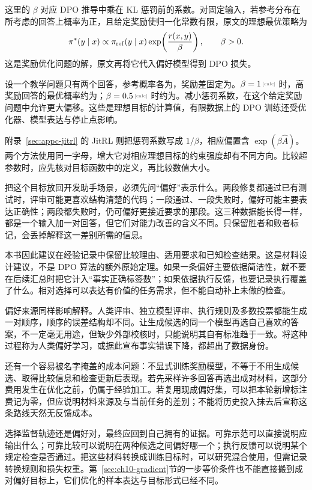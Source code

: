 这里的 $\beta$ 对应 DPO 推导中乘在 KL 惩罚前的系数。对固定输入，若参考分布在所考虑的回答上概率为正，且给定奖励使归一化常数有限，原文的理想最优策略为
\begin{equation}
 \pi^*(y\mid x)\propto\pi_{\rm ref}(y\mid x)
 \exp\!\left(\frac{r(x,y)}{\beta}\right),\qquad\beta>0.
 \label{eq:ch10-kl-scale}
\end{equation}
这是奖励优化问题的解，原文再将它代入偏好模型得到 DPO 损失\cite{dpo-2305}。

设一个教学问题只有两个回答，参考概率各为，奖励差固定为。$\beta=\calcnum{1}$ 时，高奖励回答的最优概率约为；$\beta=\calcnum{0.5}$ 时约为。减小惩罚系数，在这个给定奖励问题中允许更大偏移。这些是理想目标的计算值，有限数据上的 DPO 训练还受优化器、模型表达与停止点影响。

附录~\ref{sec:appc-jitrl} 的 JitRL 则把惩罚系数写成 $1/\beta$，相应偏置含 $\exp(\beta\widehat A)$\cite{jitrl-2601}。两个方法使用同一字母，增大它对相应理想目标的约束强度却有不同方向。比较超参数时，应先核对目标函数中的定义，再比较数值大小。

把这个目标放回开发助手场景，必须先问“偏好”表示什么。两段修复都通过已有测试时，评审可能更喜欢结构清楚的代码；一段通过、一段失败时，偏好可能主要表达正确性；两段都失败时，仍可偏好更接近要求的那段。这三种数据能长得一样，都是一个输入加一对回答，但它们对能力改善的含义不同。只保留胜者和败者标记，会丢掉解释这一差别所需的信息。

本书因此建议在经验记录中保留比较理由、适用要求和已知检查结果。这是材料设计建议，不是 DPO 算法的额外原始定理。如果一条偏好主要依据简洁性，就不要在后续汇总时把它计入“事实正确标签数”；如果依据执行反馈，也要记录执行覆盖了什么。相对选择可以表达有价值的任务需求，但不能自动补上未做的检查。

偏好来源同样影响解释。人类评审、独立模型评审、执行规则及多数投票都能生成一对顺序，顺序的误差结构却不同。让生成候选的同一个模型再选自己喜欢的答案，不一定毫无用途，但缺少外部校核时，只能说明其自有标准趋于一致。将这种过程称为人类偏好学习，或据此宣布事实错误下降，都超出了数据身份。

还有一个容易被名字掩盖的成本问题：不显式训练奖励模型，不等于不用生成候选、取得比较信息和检查更新后表现。若先采样许多回答再选出成对材料，这部分费用发生在优化之前，仍属于经验加工。若复用现成偏好集，可以把本轮新增标注费记为零，但应说明材料来源及与当前任务的差别；不能将历史投入抹去后宣称这条路线天然无反馈成本。

选择监督轨迹还是偏好对，最终应回到自己拥有的证据。可靠示范可以直接说明应输出什么；可靠比较可以说明在两种候选之间偏好哪一个；执行反馈可以说明某个规定检查是否通过。把这些材料转换成训练目标时，可以研究混合使用，但需记录转换规则和损失权重。第~\ref{sec:ch10-gradient}节的一步等价条件也不能直接搬到成对偏好目标上，它们优化的样本表达与目标形式已经不同。


